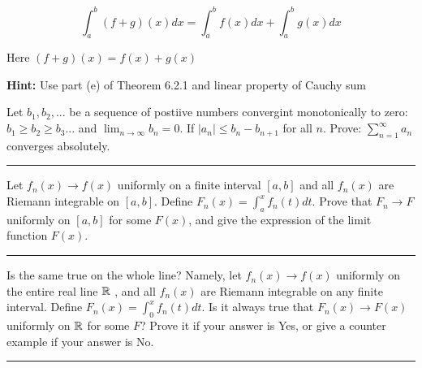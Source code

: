 \documentclass[11pt]{article}
\begin{document}
$$\int_a ^b (f + g)(x)dx = \int_a ^b f(x) dx + \int_a ^b g(x) dx$$

Here $(f + g)(x) = f(x) + g(x)$

\textbf{Hint:} Use part (e) of Theorem 6.2.1 and linear property of Cauchy sum












Let $b_1, b_2, ...$ be a sequence of postiive numbers convergint monotonically to zero:
$b_1 \geq b_2 \geq b_3 ...$ and $\lim_{n \to \infty} b_n = 0$.
If $|a_n| \leq b_n - b_{n+1}$ for all $n$. Prove:
$\sum_{n=1}^\infty a_n$ converges absolutely.

\hrule








Let $f_n(x) \to f(x)$ uniformly on a finite interval $[a,b]$ and all $f_n(x)$
are Riemann integrable on $[a,b]$. Define $F_n (x) = \int_a ^x f_n(t)dt$.
Prove that $F_n \to F$ uniformly on $[a,b]$ for some $F(x)$, 
and give the expression of the limit function $F(x)$.

\hrule



Is the same true on the whole line? Namely, let $f_n(x) \to f(x)$ uniformly on the entire real line $\mathbb{R}$
, and all $f_n(x)$ are Riemann integrable on any finite interval. Define $F_n(x) = \int_0 ^x f_n(t) dt$.
Is it always true that $F_n(x) \to F(x)$ uniformly on $\mathbb{R}$ for some $F$?
Prove it if your answer is Yes, or give a counter example if your answer is No.

\hrule
\end{document}
